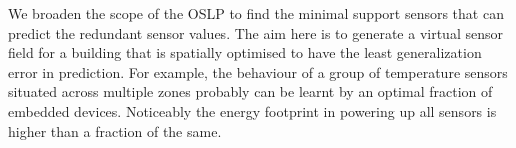 We broaden the scope of the OSLP to find the minimal support sensors that can predict the redundant sensor values. 
The aim here is to generate a virtual sensor field for a building that is spatially optimised to have the least generalization error in prediction. 
For example, the behaviour of a group of temperature sensors situated across multiple zones probably can be learnt by an optimal fraction of embedded devices. 
Noticeably the energy footprint in powering up all sensors is higher than a fraction of the same.


